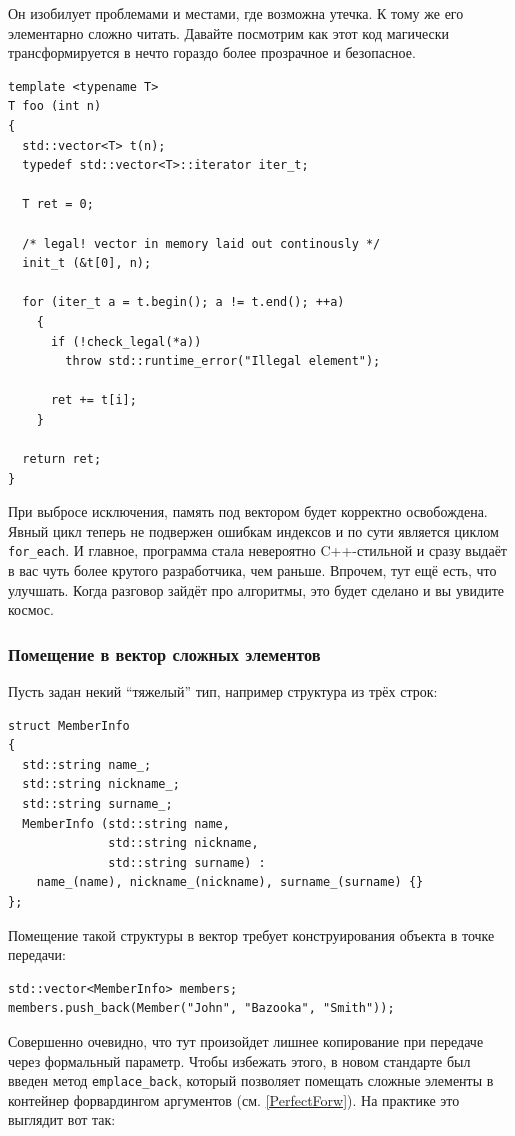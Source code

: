 \documentclass[a4paper,12pt,oneside]{article}
\begin{document}
Он изобилует проблемами и местами, где возможна утечка. К тому же его элементарно сложно читать. Давайте посмотрим как этот код магически трансформируется в нечто гораздо более прозрачное и безопасное.

\begin{lstlisting}
template <typename T>
T foo (int n)
{
  std::vector<T> t(n);
  typedef std::vector<T>::iterator iter_t;

  T ret = 0;

  /* legal! vector in memory laid out continously */
  init_t (&t[0], n); 

  for (iter_t a = t.begin(); a != t.end(); ++a)
    {
      if (!check_legal(*a))
        throw std::runtime_error("Illegal element");

      ret += t[i];
    }

  return ret;  
}
\end{lstlisting}

При выбросе исключения, память под вектором будет корректно освобождена. Явный цикл теперь не подвержен ошибкам индексов и по сути является циклом \lstinline!for_each!. И главное, программа стала невероятно C++-стильной и сразу выдаёт в вас чуть более крутого разработчика, чем раньше. Впрочем, тут ещё есть, что улучшать. Когда разговор зайдёт про алгоритмы, это будет сделано и вы увидите космос.

\subsubsection{Помещение в вектор сложных элементов}

Пусть задан некий ``тяжелый'' тип, например структура из трёх строк:

\begin{lstlisting}
struct MemberInfo 
{
  std::string name_;
  std::string nickname_;
  std::string surname_;
  MemberInfo (std::string name,
              std::string nickname,
              std::string surname) :
    name_(name), nickname_(nickname), surname_(surname) {}
};
\end{lstlisting}

Помещение такой структуры в вектор требует конструирования объекта в точке передачи:

\begin{lstlisting}
std::vector<MemberInfo> members;
members.push_back(Member("John", "Bazooka", "Smith"));
\end{lstlisting}

Совершенно очевидно, что тут произойдет лишнее копирование при передаче через формальный параметр. Чтобы избежать этого, в новом стандарте был введен метод \lstinline!emplace_back!, который позволяет помещать сложные элементы в контейнер форвардингом аргументов (см. \ref{PerfectForw}). На практике это выглядит вот так:
\end{document}
